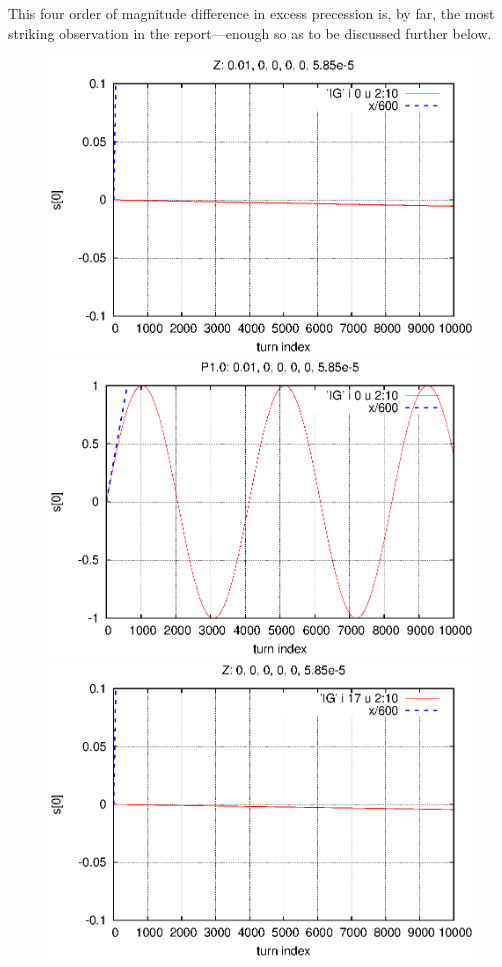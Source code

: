 \documentclass[]{article}
\begin{document}
This four order of magnitude difference in excess precession is, 
by far, the most striking observation in the report---enough so 
as to be discussed further below.
%
\begin{figure}[h]
\centering
\includegraphics[scale=0.6]{eps/SpinEvolve0.Z.eps}
\includegraphics[scale=0.6]{eps/SpinEvolve0.P1.0.eps}
\includegraphics[scale=0.6]{eps/SpinEvolve17.Z.eps}

\end{figure}
\end{document}
